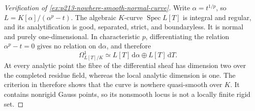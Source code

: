 \begin{proof}[Verification of
\cref{ex:p213-nowhere-smooth-normal-curve}]
Write $\alpha=t^{1/p}$, so
$L=K[\alpha]/(\alpha^p-t)$.  The algebraic $K$-curve
$\operatorname{Spec}L[T]$ is integral and regular, and its analytification
is good, separated, strict, and boundaryless.  It is normal and purely
one-dimensional.  In characteristic $p$, differentiating the relation
$\alpha^p-t=0$ gives no relation on $\mathrm d\alpha$, and therefore
\begin{equation}
 \Omega^1_{L[T]/K}
      \simeq L[T]\,\mathrm d\alpha
           \oplus L[T]\,\mathrm dT.
 \label{eq:p213-nowhere-smooth-differentials}
\end{equation}
At every analytic point the fibre of the differential sheaf has dimension
two over the completed residue field, whereas the local analytic
dimension is one.  The criterion in
\cite[§3.1.11]{Ducros24CurveStructure} therefore shows that the curve
is nowhere quasi-smooth over $K$.  It contains nonrigid Gauss points, so
its nonsmooth locus is not a locally finite rigid set.
\end{proof}
